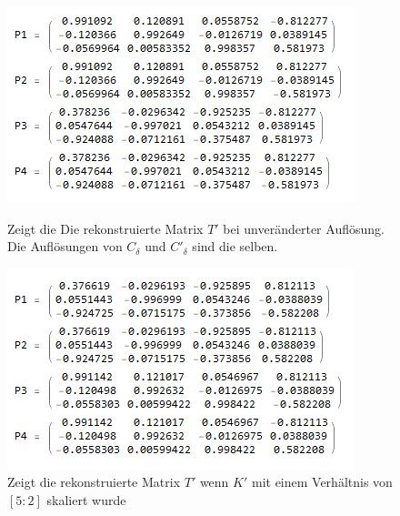 \begin{figure}[!htb]
	\includegraphics[width=\linewidth]{images/R_11.png}
	\caption[Vier Lösungen für $T$ bei gleicher Kameraauflösung]{Zeigt die Die rekonstruierte Matrix $T'$ bei unveränderter Auflösung. Die Auflösungen von $C_\delta$ und $C'_\delta$ sind die selben.}
	\label{fig:T11}
	\endminipage\hfill
	\includegraphics[width=\linewidth]{images/R_52.png}
	\caption[Vier Lösungen für $T$ bei $K'$ mit 5:2]{Zeigt die rekonstruierte Matrix $T'$ wenn $K'$ mit einem Verhältnis von $[5:2]$ skaliert wurde}
	\label{fig:T52}
	\endminipage\hfill
\end{figure}
